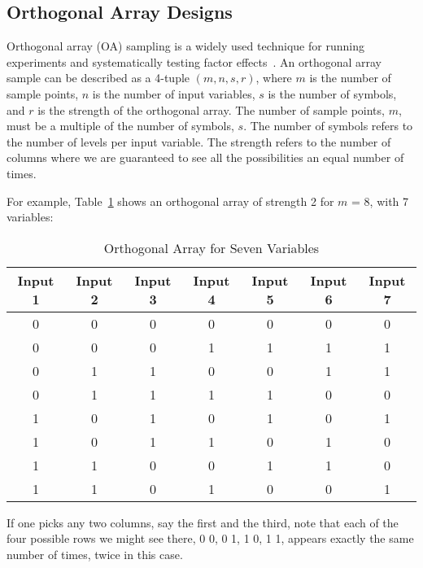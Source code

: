 \subsection{Orthogonal Array Designs}\label{dace:oas}

Orthogonal array (OA) sampling is a widely used technique for 
running experiments and systematically testing factor effects~\cite{Hed99}. 
An orthogonal array sample can be described as a 4-tuple $(m,n,s,r)$,
where $m$ is the number of sample points, $n$ is the number of input variables, 
$s$ is the number of symbols, and $r$ is the strength of the orthogonal array. 
The number of sample points, $m$, must be a multiple of the number of symbols, 
$s$.  The number of symbols refers to the number of levels per input variable. 
The strength refers to the number of columns where we are guaranteed to 
see all the possibilities an equal number of times.

For example, Table~\ref{dace:table03} shows an orthogonal array of strength 2 for $m$ = 8, with 7 variables:

\begin{table}[ht]
 \caption{Orthogonal Array for Seven Variables}
 \label{dace:table03}
 \begin{center}
  \begin{tabular}{c|c|c|c|c|c|c}
  \hline
  Input 1 & Input 2 & Input 3 & Input 4 & Input 5 & Input 6 & Input 7\\ \hline \hline 
0 & 	0 &	0 &	0 & 	0 &	0 &	0  \\ \hline
0 &	0 &	0 &	1 &	1 &	1 &	1   \\ \hline
0 &	1 & 	1 & 	0 & 	0 &	1 &	1   \\ \hline
0 &	1 &	1 &	1 &	1 &	0 &	0    \\ \hline
1 &	0 &	1 &	0 &	1 &	0 &	1   \\ \hline
1 &	0 &	1 &	1 &	0 &	1 &	0 \\ \hline
1 &	1 &	0 &	0 &	1 &	1 &	0 \\ \hline
1 &	1 &	0 &	1 &	0 &	0 &	1 \\ \hline

  \end{tabular}
\end{center}
\end{table}


If one picks any two columns, say the first and the third, note that 
each of the four possible rows we might see there,
0 0,       0 1,       1 0,       1 1,
appears exactly the same number of times, twice in this case.     

